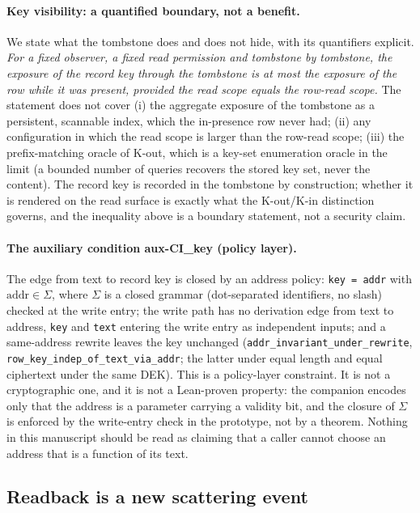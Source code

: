 \documentclass[11pt,a4paper]{article}
\newcommand{\thm}[1]{\nolinkurl{#1}}
\begin{document}
\paragraph{Key visibility: a quantified boundary, not a benefit.} We state what the tombstone does and does not hide, with its quantifiers explicit. \emph{For a fixed observer, a fixed read permission and tombstone by tombstone, the exposure of the record key through the tombstone is at most the exposure of the row while it was present, provided the read scope equals the row-read scope.} The statement does not cover (i) the aggregate exposure of the tombstone as a persistent, scannable index, which the in-presence row never had; (ii) any configuration in which the read scope is larger than the row-read scope; (iii) the prefix-matching oracle of K-out, which is a key-set enumeration oracle in the limit (a bounded number of queries recovers the stored key set, never the content). The record key is recorded in the tombstone by construction; whether it is rendered on the read surface is exactly what the K-out/K-in distinction governs, and the inequality above is a boundary statement, not a security claim.

\paragraph{The auxiliary condition aux-CI\_key (policy layer).} The edge from text to record key is closed by an address policy: \texttt{key = addr} with $\mathrm{addr}\in\Sigma$, where $\Sigma$ is a closed grammar (dot-separated identifiers, no slash) checked at the write entry; the write path has no derivation edge from text to address, \texttt{key} and \texttt{text} entering the write entry as independent inputs; and a same-address rewrite leaves the key unchanged (\thm{addr_invariant_under_rewrite}, \thm{row_key_indep_of_text_via_addr}; the latter under equal length and equal ciphertext under the same DEK). This is a policy-layer constraint. It is not a cryptographic one, and it is not a Lean-proven property: the companion encodes only that the address is a parameter carrying a validity bit, and the closure of $\Sigma$ is enforced by the write-entry check in the prototype, not by a theorem. Nothing in this manuscript should be read as claiming that a caller cannot choose an address that is a function of its text.

\subsection{Readback is a new scattering event}
\label{sec:organs-readback}
\end{document}
